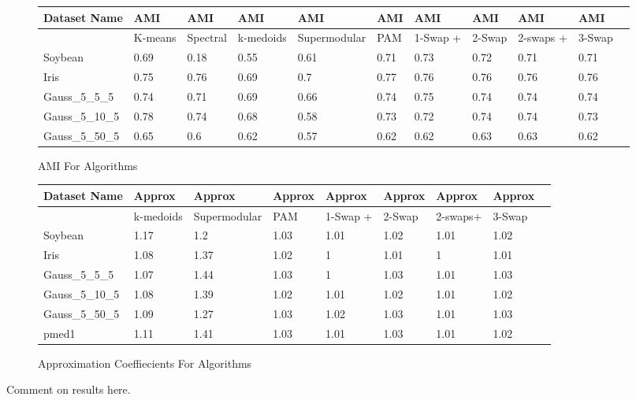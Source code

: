 \documentclass{article}
\begin{document}
\begin{figure*}[h]
\begin{tabular}{ | l | l | l | l | l | l | l | l | l | l | l | }
\hline
	Dataset Name & AMI & AMI & AMI & AMI & AMI & AMI & AMI & AMI & AMI  \\ \hline
	& K-means & Spectral & k-medoids & Supermodular & PAM & 1-Swap + & 2-Swap & 2-swaps + & 3-Swap   \\ \hline
	Soybean & 0.69 & 0.18 & 0.55 & 0.61 & 0.71 & 0.73 & 0.72 & 0.71 & 0.71  \\ 
	Iris & 0.75 & 0.76 & 0.69 & 0.7 & 0.77 & 0.76 & 0.76 & 0.76 & 0.76  \\ 
	Gauss\_5\_5\_5 & 0.74 & 0.71 & 0.69 & 0.66 & 0.74 & 0.75 & 0.74 & 0.74 & 0.74  \\ 
	Gauss\_5\_10\_5 & 0.78 & 0.74 & 0.68 & 0.58 & 0.73 & 0.72 & 0.74 & 0.74 & 0.73  \\ 
	Gauss\_5\_50\_5 & 0.65 & 0.6 & 0.62 & 0.57 & 0.62 & 0.62 & 0.63 & 0.63 & 0.62  \\ \hline
\end{tabular}


\caption{AMI For Algorithms}
\end{figure*}

\begin{figure*}[h]
\begin{tabular}{ | l | l | l | l | l | l | l | l | l | }
\hline
	Dataset Name & Approx & Approx & Approx & Approx & Approx & Approx & Approx  \\ \hline
	& k-medoids & Supermodular & PAM & 1-Swap + & 2-Swap & 2-swaps+ & 3-Swap   \\ \hline
	Soybean & 1.17 & 1.2 & 1.03 & 1.01 & 1.02 & 1.01 & 1.02  \\ 
	Iris & 1.08 & 1.37 & 1.02 & 1 & 1.01 & 1 & 1.01  \\ 
	Gauss\_5\_5\_5 & 1.07 & 1.44 & 1.03 & 1 & 1.03 & 1.01 & 1.03  \\ 
	Gauss\_5\_10\_5 & 1.08 & 1.39 & 1.02 & 1.01 & 1.02 & 1.01 & 1.02  \\ 
	Gauss\_5\_50\_5 & 1.09 & 1.27 & 1.03 & 1.02 & 1.03 & 1.01 & 1.03  \\ 
	pmed1 & 1.11 & 1.41 & 1.03 & 1.01 & 1.03 & 1.01 & 1.02  \\ \hline
\end{tabular}


\caption{Approximation Coeffiecients For Algorithms}
\end{figure*}

Comment on results here.
\end{document}
